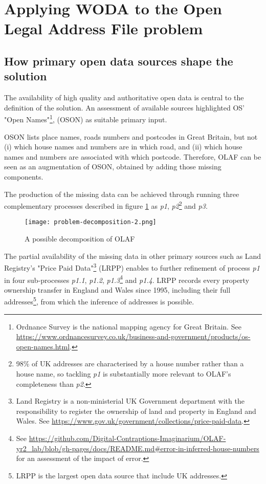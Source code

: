 \section{Applying WODA to the Open Legal Address File problem}
\label{crowdsourcing-olaf}

\subsection{How primary open data sources shape the solution}

The availability of high quality and authoritative open data is central to the definition of the solution. An assessment of available sources highlighted OS' "Open Names"\footnote{Ordnance Survey is the national mapping agency for Great Britain. See \url{https://www.ordnancesurvey.co.uk/business-and-government/products/os-open-names.html}.}, (OSON) as suitable primary input. 

OSON lists place names, roads numbers and postcodes in Great Britain, but not (i) which house names and numbers are in which road, and (ii) which house names and numbers are associated with which postcode. Therefore, OLAF can be seen as an augmentation of OSON, obtained by adding those missing components.

The production of the missing data can be achieved through running three complementary processes described in figure \ref{fig:problem_decomposition_2} as {\it p1}, {\it p2}\footnote{98\% of UK addresses are characterised by a house number rather than a house name, so tackling {\it p1} is substantially more relevant to OLAF's completeness than {\it p2}.} and {\it p3}. 

\begin{figure}
	\texttt{[image: problem-decomposition-2.png]}
	\caption{A possible decomposition of OLAF}
	\label{fig:problem_decomposition_2}
\end{figure}

The partial availability of the missing data in other primary sources such as Land Registry's "Price Paid Data"\footnote{Land Registry is a non-ministerial UK Government department with the responsibility to register the ownership of land and property in England and Wales. See \url{https://www.gov.uk/government/collections/price-paid-data}.} (LRPP) enables to further refinement of process {\it p1} in four sub-processes {\it p1.1}, {\it p1.2}, {\it p1.3}\footnote{See \url{https://github.com/Digital-Contraptions-Imaginarium/OLAF-yr2_lab/blob/gh-pages/docs/README.md#error-in-inferred-house-numbers} for an assessment of the impact of error.} and {\it p1.4}. LRPP records every property ownership transfer in England and Wales since 1995, including their full addresses\footnote{LRPP is the largest open data source that include UK addresses.}, from which the inference of addresses is possible.

